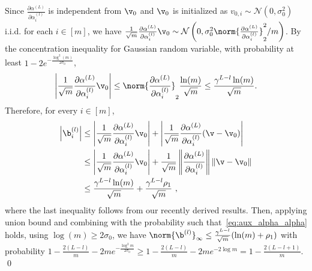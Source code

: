Since $\frac{\partial \alpha^{(L)}}{\partial \alpha_i^{(l)}}$ is independent from $\v_0$ and $\v_0$ is initialized as $v_{0,i}\sim\mathcal{N}(0,\sigma_0^2)$ i.i.d. for each $i\in[m]$, we have $\frac{1}{\sqrt{m}}\frac{\partial \alpha^{(L)}}{\partial \alpha_i^{(l)}} \v_0 \sim \mathcal{N}\left(0,\sigma_0^2\norm{\frac{\partial \alpha^{(L)}}{\partial \alpha_i^{(l)}}}^2_2/m\right)$.  By the concentration inequality for Gaussian random variable, with probability at least $1-2e^{-\frac{\log^2(m)}{2\sigma_0}}$,
\begin{align*}
    \left| \frac{1}{\sqrt{m}}\frac{\partial \alpha^{(L)}}{\partial \alpha_i^{(l)}} \v_0\right| 
    \leq
    \norm{\frac{\partial \alpha^{(L)}}{\partial \alpha_i^{(l)}}}_2
    \frac{\ln(m)}{\sqrt{m}}
    \leq \frac{\gamma^{L-l}\ln(m)}{\sqrt{m}}.
\end{align*}
Therefore, for every $i\in[m]$,
\begin{align*}
    \left| \b_i^{(l)}\right| &\leq \left|\frac{1}{\sqrt{m}}\frac{\partial \alpha^{(L)}}{\partial \alpha_i^{(l)}} \v_0\right| + \left|\frac{1}{\sqrt{m}}  \frac{\partial \alpha^{(L)}}{\partial \alpha_i^{(l)}} (\v-\v_0)\right| \\
    &\leq \left|\frac{1}{\sqrt{m}}\frac{\partial \alpha^{(L)}}{\partial \alpha_i^{(l)}} \v_0\right| + \frac{1}{\sqrt{m}}\left\|\frac{\partial \alpha^{(L)}}{\partial \alpha_i^{(l)}}\right\|\|\v - \v_0\| \\
    &\leq \frac{\gamma^{L-l} \ln(m)}{\sqrt{m}} + \frac{\gamma^{L-l} \rho_1}{\sqrt{m}}~,
\end{align*}
where the last inequality follows from our recently derived results. Then, applying union bound and combining with the probability such that~\eqref{eq:aux_alpha_alpha} holds, using $\log(m) \geq 2 \sigma_0$, we have $\norm{\b^{(l)}}_{\infty} \leq \frac{\gamma^{L-l}}{\sqrt{m}}(\ln(m)+\rho_1)$ with probability $1 - \frac{2(L-l)}{m} - 2m e^{-\frac{\log^2 m}{2\sigma_0}} \geq 1 - \frac{2(L-l)}{m} - 2m e^{-2\log m} = 1-\frac{2(L-l+1)}{m}$. \qed 


%
%


